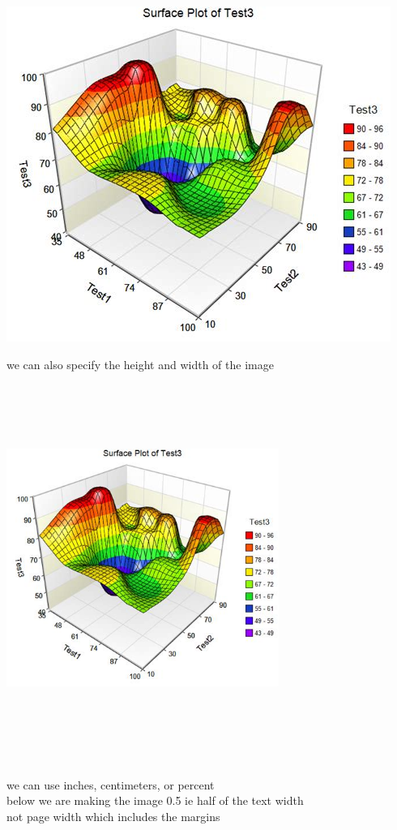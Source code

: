 \documentclass[10pt, a4paper]{article}
\begin{document}
\includegraphics[scale=0.5]{plot1}

we can also specify the height and width of the image\\


\includegraphics[width=3.5in, height=5in]{plot1}


we can use inches, centimeters, or percent\\
below we are making the image 0.5 ie half of the text width\\
not page width which includes the margins\\
\end{document}
